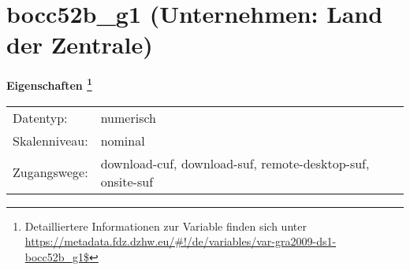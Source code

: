 
    \setcounter{footnote}{0}

    \vspace*{-1.8cm}
	\section{bocc52b\_g1 (Unternehmen: Land der Zentrale)}
	\label{section:bocc52b_g1}



    \vspace*{0.5cm}
    \noindent\textbf{Eigenschaften
	\footnote{Detailliertere Informationen zur Variable finden sich unter
		\url{https://metadata.fdz.dzhw.eu/\#!/de/variables/var-gra2009-ds1-bocc52b_g1$}}}\\
	\begin{tabularx}{\hsize}{@{}lX}
	Datentyp: & numerisch \\
	Skalenniveau: & nominal \\
	Zugangswege: &
	  download-cuf, 
	  download-suf, 
	  remote-desktop-suf, 
	  onsite-suf
 \\
    \end{tabularx}



